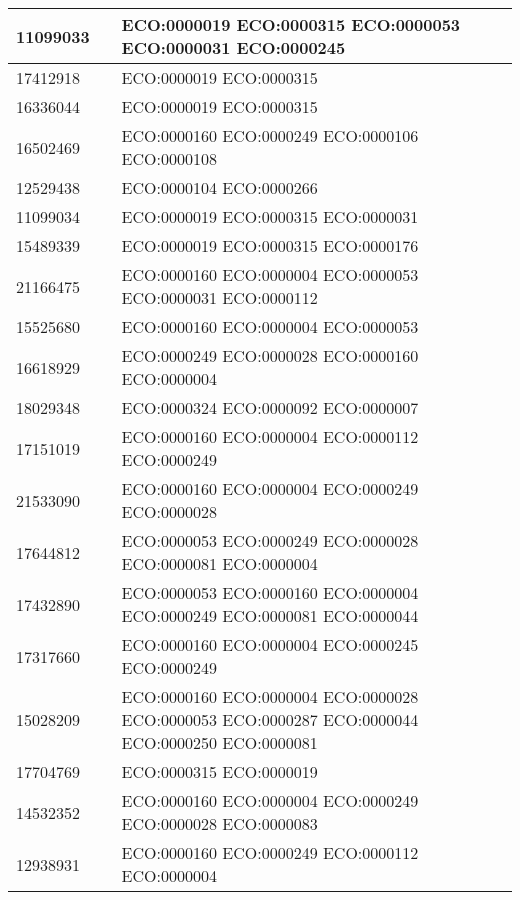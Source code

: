 \begin{longtable}[!ht]{|l|l|p{10cm}|}
11099033 &  \cite{pmid11099033}  & ECO:0000019 ECO:0000315 ECO:0000053 ECO:0000031 ECO:0000245 \\ \hline
17412918 &  \cite{pmid17412918}  & ECO:0000019 ECO:0000315 \\ \hline
16336044 &  \cite{pmid16336044}  & ECO:0000019 ECO:0000315 \\ \hline
16502469 &  \cite{pmid16502469}  & ECO:0000160 ECO:0000249 ECO:0000106 ECO:0000108 \\ \hline
12529438 &  \cite{pmid12529438}  & ECO:0000104 ECO:0000266 \\ \hline
11099034 &  \cite{pmid11099034}  & ECO:0000019 ECO:0000315 ECO:0000031 \\ \hline
15489339 &  \cite{pmid15489339}  & ECO:0000019 ECO:0000315 ECO:0000176 \\ \hline
21166475 &  \cite{pmid21166475}  & ECO:0000160 ECO:0000004 ECO:0000053 ECO:0000031 ECO:0000112 \\ \hline
15525680 &  \cite{pmid15525680}  & ECO:0000160 ECO:0000004 ECO:0000053 \\ \hline
16618929 &  \cite{pmid16618929}  & ECO:0000249 ECO:0000028 ECO:0000160 ECO:0000004 \\ \hline
18029348 &  \cite{pmid18029348}  & ECO:0000324 ECO:0000092 ECO:0000007 \\ \hline
17151019 &  \cite{pmid17151019}  & ECO:0000160 ECO:0000004 ECO:0000112 ECO:0000249 \\ \hline
21533090 &  \cite{pmid21533090}  & ECO:0000160 ECO:0000004 ECO:0000249 ECO:0000028 \\ \hline
17644812 &  \cite{pmid17644812}  & ECO:0000053 ECO:0000249 ECO:0000028 ECO:0000081 ECO:0000004 \\ \hline
17432890 &  \cite{pmid17432890}  & ECO:0000053 ECO:0000160 ECO:0000004 ECO:0000249 ECO:0000081 ECO:0000044 \\ \hline
17317660 &  \cite{pmid17317660}  & ECO:0000160 ECO:0000004 ECO:0000245 ECO:0000249 \\ \hline
15028209 &  \cite{pmid15028209}  & ECO:0000160 ECO:0000004 ECO:0000028 ECO:0000053 ECO:0000287 ECO:0000044 ECO:0000250 ECO:0000081 \\ \hline
17704769 &  \cite{pmid17704769}  & ECO:0000315 ECO:0000019 \\ \hline
14532352 &  \cite{pmid14532352}  & ECO:0000160 ECO:0000004 ECO:0000249 ECO:0000028 ECO:0000083 \\ \hline
12938931 &  \cite{pmid12938931}  & ECO:0000160 ECO:0000249 ECO:0000112 ECO:0000004 \\ \hline

\end{longtable}
